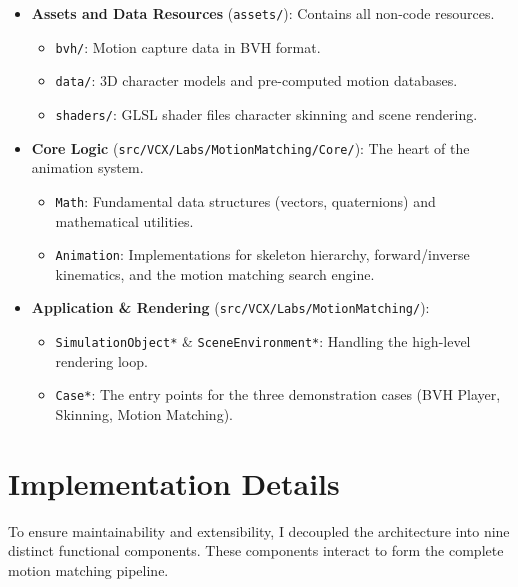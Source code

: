 \documentclass[8pt,a4paper]{extarticle}
\begin{document}
\begin{itemize}
    \item \textbf{Assets and Data Resources} (\texttt{assets/}): Contains all non-code resources.
          \begin{itemize}
              \item \texttt{bvh/}: Motion capture data in BVH format.
              \item \texttt{data/}: 3D character models and pre-computed motion databases.
              \item \texttt{shaders/}: GLSL shader files character skinning and scene rendering.
          \end{itemize}

    \item \textbf{Core Logic} (\texttt{src/VCX/Labs/MotionMatching/Core/}): The heart of the animation system.
          \begin{itemize}
              \item \texttt{Math}: Fundamental data structures (vectors, quaternions) and mathematical utilities.
              \item \texttt{Animation}: Implementations for skeleton hierarchy, forward/inverse kinematics, and the motion matching search engine.
          \end{itemize}

    \item \textbf{Application \& Rendering} (\texttt{src/VCX/Labs/MotionMatching/}):
          \begin{itemize}
              \item \texttt{SimulationObject*} \& \texttt{SceneEnvironment*}: Handling the high-level rendering loop.
              \item \texttt{Case*}: The entry points for the three demonstration cases (BVH Player, Skinning, Motion Matching).
          \end{itemize}
\end{itemize}


\section{Implementation Details}
To ensure maintainability and extensibility, I decoupled the architecture into nine distinct functional components. These components interact to form the complete motion matching pipeline.
\end{document}
